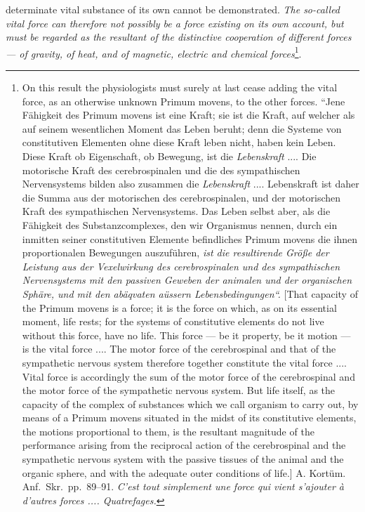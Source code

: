 \documentclass[12pt,a4paper]{book}
\begin{document}
determinate vital substance of its own cannot be demonstrated. \emph{The
so-called vital force can therefore not possibly be a force existing on its own
account, but must be regarded as the resultant of the distinctive cooperation
of different forces --- of gravity, of heat, and of magnetic, electric and
chemical forces}\footnote{On this result the physiologists must surely at last
cease adding the vital force, as an otherwise unknown Primum movens,
to the other forces. ``Jene Fähigkeit des Primum movens ist eine Kraft; sie ist
die Kraft, auf welcher als auf seinem wesentlichen Moment das Leben beruht;
denn die Systeme von constitutiven Elementen ohne diese Kraft leben nicht,
haben kein Leben. Diese Kraft ob Eigenschaft, ob Bewegung, ist die
\emph{Lebenskraft} .... Die motorische Kraft des cerebrospinalen und die des
sympathischen Nervensystems bilden also zusammen die \emph{Lebenskraft} ....
Lebenskraft ist daher die Summa aus der motorischen des cerebrospinalen, und
der motorischen Kraft des sympathischen Nervensystems. Das Leben selbst aber,
als die Fähigkeit des Substanzcomplexes, den wir Organismus nennen, durch ein
inmitten seiner constitutiven Elemente befindliches Primum movens die ihnen
proportionalen Bewegungen auszuführen, \emph{ist die resultirende Größe der
Leistung aus der Vexelwirkung des cerebrospinalen und des sympathischen
Nervensystems mit den passiven Geweben der animalen und der organischen
Sphäre, und mit den abäqvaten aüssern Lebensbedingungen“.} [That capacity of
the Primum movens is a force; it is the force on which, as on its essential
moment, life rests; for the systems of constitutive elements do not live
without this force, have no life. This force --- be it property, be it motion
--- is the vital force .... The motor force of the cerebrospinal and
that of the sympathetic nervous system therefore together constitute the
vital force .... Vital force is accordingly the sum of the motor force
of the cerebrospinal and the motor force of the sympathetic nervous system. But
life itself, as the capacity of the complex of substances which we call
organism to carry out, by means of a Primum movens situated in the midst of its
constitutive elements, the motions proportional to them, is the resultant
magnitude of the performance arising from the reciprocal action of the
cerebrospinal and the sympathetic nervous system with the passive tissues of
the animal and the organic sphere, and with the adequate outer conditions of
life.] A. Kortüm. Anf.\ Skr.\ pp.~89--91.
\textit{C'est tout simplement une force qui vient s'ajouter à d'autres
forces .... Quatrefages.}}.
\end{document}
